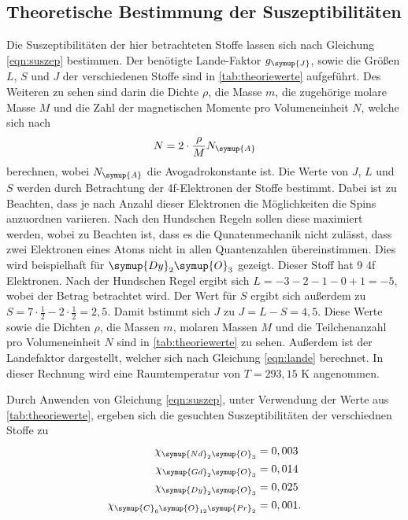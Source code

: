     \subsection{Theoretische Bestimmung der Suszeptibilitäten}
    Die Suszeptibilitäten der hier betrachteten Stoffe lassen sich nach Gleichung \eqref{eqn:suszep} bestimmen.
    Der benötigte Lande-Faktor $g_{\symup{J}}$, sowie die Größen $L$, $S$ und $J$ der verschiedenen Stoffe sind in \autoref{tab:theoriewerte}
    aufgeführt. Des Weiteren zu sehen sind darin die Dichte $\rho$, die Masse $m$, die zugehörige molare Masse $M$ und die Zahl der magnetischen
    Momente pro Volumeneinheit $N$, welche sich nach 
    \begin{equation}
    \label{eqn:N}
        N = 2 \cdot \frac{\rho}{M} N_{\symup{A}}
    \end{equation}
    berechnen, wobei $N_{\symup{A}}$ die Avogadrokonstante ist. Die Werte von $J$, $L$ und $S$ werden durch Betrachtung der 4f-Elektronen 
    der Stoffe bestimmt. Dabei ist zu Beachten, dass je nach Anzahl dieser Elektronen die Möglichkeiten die Spins anzuordnen variieren.
    Nach den Hundschen Regeln sollen diese maximiert werden, wobei zu Beachten ist, dass es die Qunatenmechanik nicht zulässt, dass zwei 
    Elektronen eines Atoms nicht in allen Quantenzahlen übereinstimmen. Dies wird beispielhaft für $\symup{Dy}_2\symup{O}_3$ gezeigt.
    Dieser Stoff hat 9 4f Elektronen. Nach der Hundschen Regel ergibt sich $L = -3-2-1-0+1 = -5$, wobei der Betrag betrachtet wird.
    Der Wert für $S$ ergibt sich außerdem zu $S = 7 \cdot \frac{1}{2} - 2 \cdot \frac{1}{2} = 2,5$.
     Damit bstimmt sich $J$ zu $J = L - S = 4,5$. Diese Werte sowie die Dichten $\rho$, die Massen $m$, molaren Massen $M$ und die 
    Teilchenanzahl pro Volumeneinheit $N$ sind in \autoref{tab:theoriewerte} zu sehen. Außerdem ist der Landefaktor dargestellt,
    welcher sich nach Gleichung \eqref{eqn:lande} berechnet. In dieser Rechnung wird eine Raumtemperatur von $T = 293,15$ K angenommen.

    
    Durch Anwenden von Gleichung \eqref{eqn:suszep}, unter Verwendung der Werte aus \autoref{tab:theoriewerte}, ergeben sich die gesuchten 
    Suszeptibilitäten der verschiednen Stoffe zu 
    \begin{align*}
        \chi_{\symup{Nd}_2\symup{O}_3} &= 0,003 \\
        \chi_{\symup{Gd}_2\symup{O}_3} &= 0,014 \\
        \chi_{\symup{Dy}_2\symup{O}_3} &= 0,025 \\
        \chi_{\symup{C}_6\symup{O}_{12}\symup{Pr}_2} &= 0,001. 
    \end{align*} 

